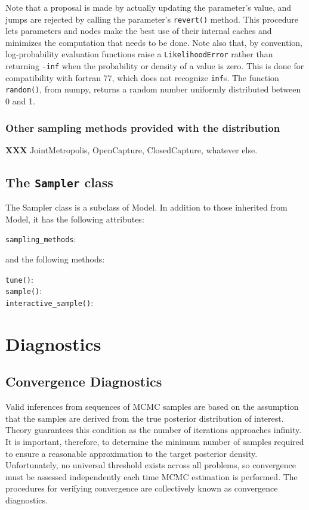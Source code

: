 \documentclass[]{book}
\begin{document}
Note that a proposal is made by actually updating the parameter's value, and jumps are rejected by calling the parameter's \texttt{revert()} method. This procedure lets parameters and nodes make the best use of their internal caches and minimizes the computation that needs to be done. Note also that, by convention, log-probability evaluation functions raise a \texttt{LikelihoodError} rather than returning \texttt{-inf} when the probability or density of a value is zero. This is done for compatibility with fortran 77, which does not recognize \texttt{inf}s. The function \texttt{random()}, from numpy, returns a random number uniformly distributed between 0 and 1.


\subsection{Other sampling methods provided with the distribution}\label{sub:other_sm}
\textbf{XXX} JointMetropolis, OpenCapture, ClosedCapture, whatever else.




\section{The \texttt{Sampler} class}\label{sec:Sampler}
The Sampler class is a subclass of Model. In addition to those inherited from Model, it has the following attributes:
\begin{description}
	\item[\texttt{sampling\_methods}:]
\end{description}
and the following methods:
\begin{description}
	\item[\texttt{tune()}:]
	\item[\texttt{sample()}:]
	\item[\texttt{interactive\_sample()}:] 
\end{description}


\chapter{Diagnostics} %

\section{Convergence Diagnostics}

Valid inferences from sequences of MCMC samples are based on the assumption that the samples are derived from the true posterior distribution of interest. Theory guarantees this condition as the number of iterations approaches infinity. It is important, therefore, to determine the minimum number of samples required to ensure a reasonable approximation to the target posterior density. Unfortunately, no universal threshold exists across all problems, so convergence must be assessed independently each time MCMC estimation is performed. The procedures for verifying convergence are collectively known as convergence diagnostics.
\end{document}
